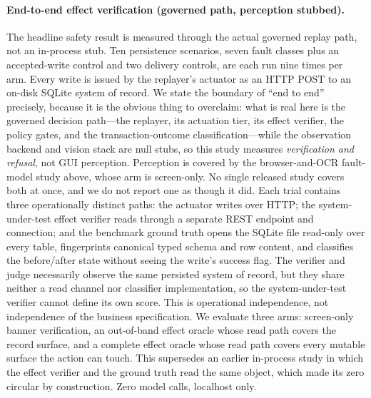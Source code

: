 \paragraph{End-to-end effect verification (governed path, perception stubbed).}
The headline safety result is measured through the actual governed replay path,
not an in-process stub. Ten persistence scenarios, seven fault classes plus an
accepted-write control and two delivery controls, are each run nine times per
arm. Every write is issued by the replayer's actuator as an HTTP POST to an
on-disk SQLite system of record. We state the boundary of ``end to end''
precisely, because it is the obvious thing to overclaim: what is real here is
the governed decision path---the replayer, its actuation tier, its effect
verifier, the policy gates, and the transaction-outcome classification---while
the observation backend and vision stack are null stubs, so this study measures
\emph{verification and refusal}, not GUI perception. Perception is covered by
the browser-and-OCR fault-model study above, whose arm is screen-only. No single
released study covers both at once, and we do not report one as though it did.
Each trial contains three operationally
distinct paths: the actuator writes over HTTP; the system-under-test effect
verifier reads through a separate REST endpoint and connection; and the
benchmark ground truth opens the SQLite file read-only over every table,
fingerprints canonical typed schema and row content, and classifies the
before/after state without seeing the write's success flag. The verifier and
judge necessarily observe the same persisted system of record, but they share
neither a read channel nor classifier implementation, so the system-under-test
verifier cannot define its own score. This is operational independence, not
independence of the business specification. We evaluate three arms:
screen-only banner verification, an out-of-band effect oracle whose read path
covers the record surface, and a complete effect oracle whose read path covers
every mutable surface the action can touch. This supersedes an earlier in-process
study in which the effect verifier and the ground truth read the same object,
which made its zero circular by construction. Zero model calls, localhost only.

